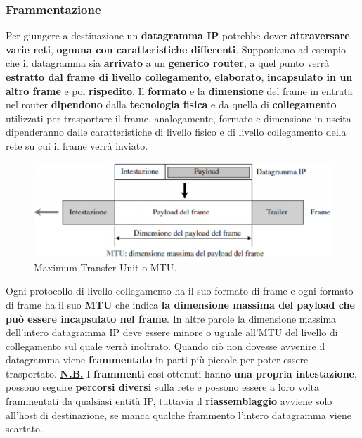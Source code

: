 \documentclass[11pt,a4paper,oneside]{book}
\theoremstyle{definition}
\begin{document}
\pagebreak

\subsubsection{Frammentazione}
Per giungere a destinazione un \textbf{datagramma IP} potrebbe dover \textbf{attraversare varie reti},\textbf{ ognuna con caratteristiche differenti}. Supponiamo ad esempio che il datagramma sia \textbf{arrivato} a un \textbf{generico router}, a quel punto verrà \textbf{estratto dal frame di livello collegamento}, \textbf{elaborato}, \textbf{incapsulato in un altro frame} e poi \textbf{rispedito}. Il \textbf{formato} e la \textbf{dimensione} del frame in entrata nel router \textbf{dipendono} dalla \textbf{tecnologia fisica} e da quella di \textbf{collegamento} utilizzati per trasportare il frame, analogamente, formato e dimensione in uscita dipenderanno dalle caratteristiche di livello fisico e di livello collegamento della rete su cui il frame verrà inviato.

\begin{figure}[!h]
	\includegraphics[scale=0.25]{Immagini/MTU.png}
	\centering
	\caption{Maximum Transfer Unit o MTU.}
\end{figure}

Ogni protocollo di livello collegamento ha il suo formato di frame e ogni formato di frame ha il suo \textbf{MTU} che indica \textbf{la dimensione massima del payload che può essere incapsulato nel frame}. In altre parole la dimensione massima dell'intero datagramma IP deve essere minore o uguale all'MTU del livello di collegamento sul quale verrà inoltrato. Quando ciò non dovesse avvenire il datagramma viene \textbf{frammentato} in parti più piccole per poter essere trasportato. \textbf{\underline{N.B.}} I \textbf{frammenti} così ottenuti hanno  \textbf{una propria intestazione}, possono seguire \textbf{percorsi diversi} sulla rete e possono essere a loro volta frammentati da qualsiasi entità IP, tuttavia il \textbf{riassemblaggio} avviene solo all'host di destinazione, se manca qualche frammento l'intero datagramma viene scartato.
\end{document}
